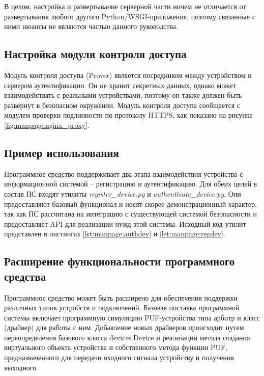 

В целом, настройка и развертывание серверной части ничем не отличается от развертывания любого другого Python/WSGI-приложения, поэтому связанные с ними нюансы не являются частью данного руководства.

\subsection{Настройка модуля контроля доступа}
\label{sec:manpage:client_setup}
Модуль контроля доступа (Prover) является посредником между устройством и сервером аутентификации. Он не хранит секретных данных, однако может взаимодействать с реальными устройствами, поэтому он также должен быть развернут в безопасном окружении. Модуль контроля доступа сообщается с модулем проверки подлинности по протоколу HTTPS, как показано на рисунке \ref{fig:manpage:nginx_proxy}.


\subsection{Пример использования}
Программное средство поддерживает два этапа взаимодействия устройства с информационной системой -- регистрацию и аутентификацию. Для обеих целей в состав ПС входят утилиты \emph{register\_device.py} и \emph{authenticate\_device.py}. Они предоставляют базовый функционал и носят скорее демонстрационный характер, так как ПС рассчитана на интеграцию с существующей системой безопасности и предоставляет API для реализации нужд этой системы. Исходный код утилит представлен в листингах \ref{lst:manpage:authdev} и \ref{lst:manpage:regdev}.





\subsection{Расширение функциональности программного средства}
Программное средство может быть расширено для обеспечения поддержки различных типов устройств и подключений. Базовая поставка программной системы включает программную симуляцию PUF-устройства типа арбитр и класс (драйвер) для работы с ним. Добавление новых драйверов происходит путем переопределения базового класса devices.Device и реализации метода создания виртуального объекта устройства и собственного метода функции PUF, предназначенного для передачи входного сигнала устройству и получения выходного.


